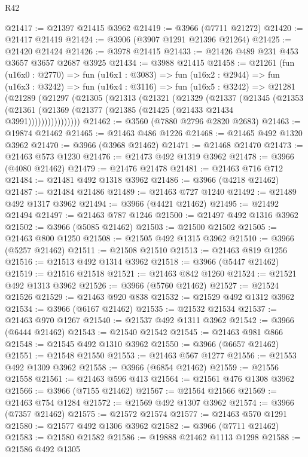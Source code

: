 \begin{lexlean}{R42}
\begin{coremodule}
@21417 := @21397 @21415 @3962
@21419 := @3966 (@7711 @21272)
@21420 := @21417 @21419
@21424 := @3906 (@3907 @1291 @21396 @21264)
@21425 := @21420 @21424
@21426 := @3978 @21415
@21433 := @21426 @489 @231 @453 @3657 @3657 @2687 @3925
@21434 := @3988 @21415
@21458 := @21261
    (fun (u16x0 : @2770) =>
    fun (u16x1 : @3083) =>
    fun (u16x2 : @2944) =>
    fun (u16x3 : @3242) =>
    fun (u16x4 : @3116) =>
    fun (u16x5 : @3242) =>
    @21281
      (@21289
        (@21297
          (@21305
            (@21313
              (@21321
                (@21329
                  (@21337
                    (@21345
                      (@21353
                        (@21361 (@21369 (@21377 (@21385 (@21425 (@21433 @21434 @3991))))))))))))))))
@21462 := @3560 (@7880 @2796 @2820 @2683)
@21463 := @19874 @21462
@21465 := @21463 @486 @1226
@21468 := @21465 @492 @1320 @3962
@21470 := @3966 (@3968 @21462)
@21471 := @21468 @21470
@21473 := @21463 @573 @1230
@21476 := @21473 @492 @1319 @3962
@21478 := @3966 (@4080 @21462)
@21479 := @21476 @21478
@21481 := @21463 @716 @712
@21484 := @21481 @492 @1318 @3962
@21486 := @3966 (@4218 @21462)
@21487 := @21484 @21486
@21489 := @21463 @727 @1240
@21492 := @21489 @492 @1317 @3962
@21494 := @3966 (@4421 @21462)
@21495 := @21492 @21494
@21497 := @21463 @787 @1246
@21500 := @21497 @492 @1316 @3962
@21502 := @3966 (@5085 @21462)
@21503 := @21500 @21502
@21505 := @21463 @800 @1250
@21508 := @21505 @492 @1315 @3962
@21510 := @3966 (@5257 @21462)
@21511 := @21508 @21510
@21513 := @21463 @819 @1256
@21516 := @21513 @492 @1314 @3962
@21518 := @3966 (@5447 @21462)
@21519 := @21516 @21518
@21521 := @21463 @842 @1260
@21524 := @21521 @492 @1313 @3962
@21526 := @3966 (@5760 @21462)
@21527 := @21524 @21526
@21529 := @21463 @920 @838
@21532 := @21529 @492 @1312 @3962
@21534 := @3966 (@6167 @21462)
@21535 := @21532 @21534
@21537 := @21463 @970 @1267
@21540 := @21537 @492 @1311 @3962
@21542 := @3966 (@6444 @21462)
@21543 := @21540 @21542
@21545 := @21463 @981 @866
@21548 := @21545 @492 @1310 @3962
@21550 := @3966 (@6657 @21462)
@21551 := @21548 @21550
@21553 := @21463 @567 @1277
@21556 := @21553 @492 @1309 @3962
@21558 := @3966 (@6854 @21462)
@21559 := @21556 @21558
@21561 := @21463 @596 @413
@21564 := @21561 @476 @1308 @3962
@21566 := @3966 (@7155 @21462)
@21567 := @21564 @21566
@21569 := @21463 @754 @1284
@21572 := @21569 @492 @1307 @3962
@21574 := @3966 (@7357 @21462)
@21575 := @21572 @21574
@21577 := @21463 @570 @1291
@21580 := @21577 @492 @1306 @3962
@21582 := @3966 (@7711 @21462)
@21583 := @21580 @21582
@21586 := @19888 @21462 @1113 @1298
@21588 := @21586 @492 @1305

\end{coremodule}
\end{lexlean}
